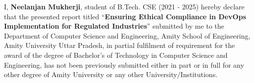\justifying
I, \textbf{Neelanjan Mukherji}, student of B.Tech. CSE (2021 - 2025) hereby declare that the presented report titled “\textbf{Ensuring Ethical Compliance in DevOps Implementation for Regulated Industries}” submitted by me to the Department of Computer Science and Engineering, Amity School of Engineering, Amity University Uttar Pradesh, in partial fulfilment of requirement for the award of the degree of Bachelor’s of Technology in Computer Science and Engineering, has not been previously submitted either in part or in full for any other degree of Amity University or any other University/Institutions.